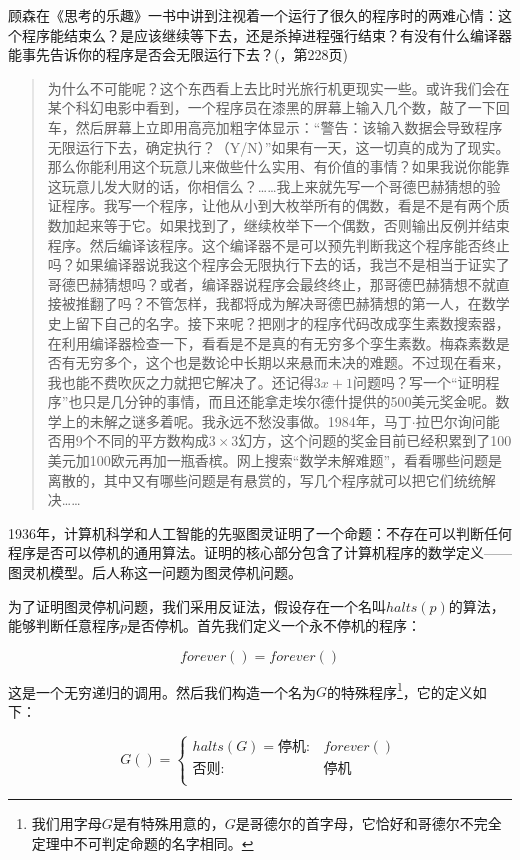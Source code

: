 \documentclass{article}
\begin{document}
顾森在《思考的乐趣》一书中讲到注视着一个运行了很久的程序时的两难心情：这个程序能结束么？是应该继续等下去，还是杀掉进程强行结束？有没有什么编译器能事先告诉你的程序是否会无限运行下去？(\cite{GuSen-2012}，第228页)

\begin{quotation}
为什么不可能呢？这个东西看上去比时光旅行机更现实一些。或许我们会在某个科幻电影中看到，一个程序员在漆黑的屏幕上输入几个数，敲了一下回车，然后屏幕上立即用高亮加粗字体显示：“警告：该输入数据会导致程序无限运行下去，确定执行？（Y/N）”如果有一天，这一切真的成为了现实。那么你能利用这个玩意儿来做些什么实用、有价值的事情？如果我说你能靠这玩意儿发大财的话，你相信么？……我上来就先写一个哥德巴赫猜想的验证程序。我写一个程序，让他从小到大枚举所有的偶数，看是不是有两个质数加起来等于它。如果找到了，继续枚举下一个偶数，否则输出反例并结束程序。然后编译该程序。这个编译器不是可以预先判断我这个程序能否终止吗？如果编译器说我这个程序会无限执行下去的话，我岂不是相当于证实了哥德巴赫猜想吗？或者，编译器说程序会最终终止，那哥德巴赫猜想不就直接被推翻了吗？不管怎样，我都将成为解决哥德巴赫猜想的第一人，在数学史上留下自己的名字。接下来呢？把刚才的程序代码改成孪生素数搜索器，在利用编译器检查一下，看看是不是真的有无穷多个孪生素数。梅森素数是否有无穷多个，这个也是数论中长期以来悬而未决的难题。不过现在看来，我也能不费吹灰之力就把它解决了。还记得$3x+1$问题吗？写一个“证明程序”也只是几分钟的事情，而且还能拿走埃尔德什提供的500美元奖金呢。数学上的未解之谜多着呢。我永远不愁没事做。1984年，马丁$\cdot$拉巴尔询问能否用9个不同的平方数构成$3 \times 3$幻方，这个问题的奖金目前已经积累到了100美元加100欧元再加一瓶香槟。网上搜索“数学未解难题”，看看哪些问题是离散的，其中又有哪些问题是有悬赏的，写几个程序就可以把它们统统解决……
\end{quotation}

1936年，计算机科学和人工智能的先驱图灵证明了一个命题：不存在可以判断任何程序是否可以停机的通用算法。证明的核心部分包含了计算机程序的数学定义——图灵机模型。后人称这一问题为图灵停机问题。

为了证明图灵停机问题，我们采用反证法，假设存在一个名叫$halts(p)$的算法，能够判断任意程序$p$是否停机。首先我们定义一个永不停机的程序：

\[
forever() = forever()
\]

这是一个无穷递归的调用。然后我们构造一个名为$G$的特殊程序\footnote{我们用字母$G$是有特殊用意的，$G$是哥德尔的首字母，它恰好和哥德尔不完全定理中不可判定命题的名字相同。}，它的定义如下：

\[
G() = \begin{cases}
halts(G) = \text{停机}: & forever() \\
\text{否则}: & \text{停机} \\
\end{cases}
\]
\end{document}
